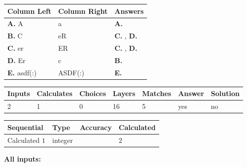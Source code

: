 \documentclass[12pt]{article}
\begin{document}
  
\begin{tabular}{|l|l|l|}
 \hline
 Column Left & Column Right  & Answers       \\ 
 \hline
{\textbf{\large{
A.}}}
A
  & 
a
 & 
{\textbf{\large{
A.}}}
 \\ 
 \hline
{\textbf{\large{
B.}}}
C
  & 
eR
 & 
{\textbf{\large{
C.}}}
, 
{\textbf{\large{
D.}}}
 \\ 
 \hline
{\textbf{\large{
C.}}}
er
  & 
ER
 & 
{\textbf{\large{
C.}}}
, 
{\textbf{\large{
D.}}}
 \\ 
 \hline
{\textbf{\large{
D.}}}
Er
  & 
c
 & 
{\textbf{\large{
B.}}}
 \\ 
 \hline
{\textbf{\large{
E.}}}
asdf(:)
  & 
ASDF(:)
 & 
{\textbf{\large{
E.}}}
 \\ 
 \hline
 \end{tabular}
  
  
 
 
\noindent{}
 
 
 
   
   
   
   
\noindent\begin{tabular}{|l|l|l|l|l|l|l|}
 \hline
Inputs & Calculates & Choices & Layers & Matches & Answer & Solution \\ \hline
           2  & 
           1  & 
           0
  & 
          16  & 
           5  & 
  yes & 
  no 
  \\ \hline
 \end{tabular}
   
   
   
   
\noindent{}
   
   
  
  
\noindent\begin{tabular}{|l|l|l|l|}
\hline
 Sequential & Type & Accuracy & Calculated \\ 
\hline
 
 
  Calculated $            1 $ & integer &  & 
  $ 2 $ 
 \\  \hline  
 \end{tabular}
   
   
   
   
\noindent\vspace{0.1in}\hspace{-0.08in} {\textbf{\Large{All inputs: }}}
   
\end{document}
